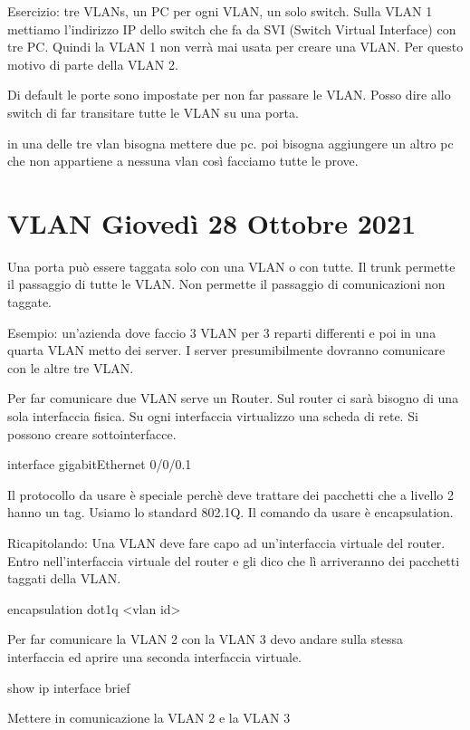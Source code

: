 \documentclass{article}
\begin{document}
    Esercizio: tre VLANs, un PC per ogni VLAN, un solo switch. Sulla VLAN 1 mettiamo l'indirizzo IP dello switch che fa da SVI (Switch Virtual Interface) con tre PC. Quindi la VLAN 1 non verrà mai usata per creare una VLAN. Per questo motivo di parte della VLAN 2.

    Di default le porte sono impostate per non far passare le VLAN. Posso dire allo switch di far transitare tutte le VLAN su una porta.

    in una delle tre vlan bisogna mettere due pc. poi bisogna aggiungere un altro pc che non appartiene a nessuna vlan così facciamo tutte le prove. 

    \section{VLAN Giovedì 28 Ottobre 2021}

    Una porta può essere taggata solo con una VLAN o con tutte.
    Il trunk permette il passaggio di tutte le VLAN. Non permette il passaggio di comunicazioni non taggate.

    Esempio: un'azienda dove faccio 3 VLAN per 3 reparti differenti e poi in una quarta VLAN metto dei server. I server presumibilmente dovranno comunicare con le altre tre VLAN.

    Per far comunicare due VLAN serve un Router. Sul router ci sarà bisogno di una sola interfaccia fisica.
    Su ogni interfaccia virtualizzo una scheda di rete.
    Si possono creare sottointerfacce.

    interface gigabitEthernet 0/0/0.1

    Il protocollo da usare è speciale perchè deve trattare dei pacchetti che a livello 2 hanno un tag.
    Usiamo lo standard 802.1Q. Il comando da usare è encapsulation.

    Ricapitolando:
    Una VLAN deve fare capo ad un'interfaccia virtuale del router.
    Entro nell'interfaccia virtuale del router e gli dico che lì arriveranno dei pacchetti taggati della VLAN.

    encapsulation dot1q <vlan id>

    Per far comunicare la VLAN 2 con la VLAN 3 devo andare sulla stessa interfaccia ed aprire una seconda interfaccia virtuale.

    show ip interface brief

    Mettere in comunicazione la VLAN 2 e la VLAN 3
\end{document}
